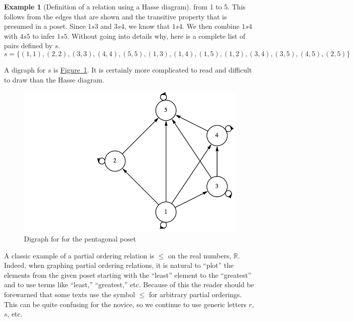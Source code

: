 \documentclass[10pt,]{book}
\theoremstyle{plain}
\theoremstyle{definition}
\theoremstyle{definition}
\theoremstyle{definition}
\newtheorem{example}[theorem]{Example}
\theoremstyle{definition}
\begin{document}
\begin{example}[Definition of a relation using a Hasse diagram]
from 1 to 5. This follows from the edges that are shown and the transitive property that is presumed in a poset.  Since \(1 s 3\) and \(3 s
4\), we know that \(1 s 4\). We then combine \(1 s 4\) with \(4 s 5\) to infer \(1 s 5\).  Without going into details why, here is
a complete list of pairs defined by \(s\).
\[s = \{(1,1),(2,2),(3,3),(4,4),(5,5),(1,3),(1,4),(1,5),(1,2),(3,4),(3,5),(4,5),(2,5)\}\]%
\par
A digraph for \(s\) is \hyperref[fig-pentagonal-digraph]{Figure~\ref{fig-pentagonal-digraph}}. It is certainly more complicated to read and difficult to draw than the Hasse diagram.%
\leavevmode%
\begin{figure}
\centering
\includegraphics[width=1\linewidth]{images/pentagonal-digraph.png}
\caption{Digraph for for the pentagonal poset
                \label{fig-pentagonal-digraph}}
\end{figure}
\end{example}
\par
A classic example of a partial ordering relation is \(\leq \) on the real numbers, \(\mathbb{R}\). Indeed, when graphing partial ordering relations,
it is natural to ``plot'' the elements from the given poset starting with the ``least'' element to the ``greatest'' and to use terms
like ``least,'' ``greatest,'' etc. Because of this the reader should be forewarned that some texts use the symbol \(\leq\) for arbitrary
partial orderings. This can be quite confusing for the novice, so we continue to use generic letters \(r\), \(s\), etc.
%
\typeout{************************************************}
\typeout{************************************************}
\end{document}
